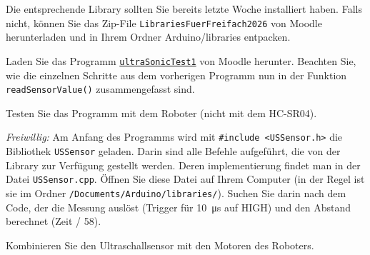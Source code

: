 Die entsprechende Library sollten Sie bereits letzte Woche installiert haben. Falls nicht, können Sie das Zip-File \texttt{LibrariesFuerFreifach2026} von Moodle herunterladen und in Ihrem Ordner Arduino/libraries entpacken.
\begin{myexercise}

    Laden Sie das Programm \hyperref[lst:ultraschall-roboter]{\texttt{ultraSonicTest1}} von Moodle herunter.
    \newline
    Beachten Sie, wie die einzelnen Schritte aus dem vorherigen Programm nun in der Funktion \lstinline|readSensorValue()| zusammengefasst sind.
    \begin{aenum}
        \item Testen Sie das Programm mit dem Roboter (nicht mit dem HC-SR04).
        \item \emph{Freiwillig:} Am Anfang des Programms wird mit \lstinline|#include <USSensor.h>| die Bibliothek \lstinline|USSensor| geladen. Darin sind alle Befehle aufgeführt, die von der Library zur Verfügung gestellt werden. Deren implementierung findet man in der Datei \texttt{USSensor.cpp}. Öffnen Sie diese Datei auf Ihrem Computer (in der Regel ist sie im Ordner \lstinline|/Documents/Arduino/libraries/|). Suchen Sie darin nach dem Code, der die Messung auslöst (Trigger für \qty{10}{\micro\second} auf HIGH) und den Abstand berechnet (Zeit / 58).
    \end{aenum}

\end{myexercise}

Kombinieren Sie den Ultraschallsensor mit den Motoren des Roboters.

